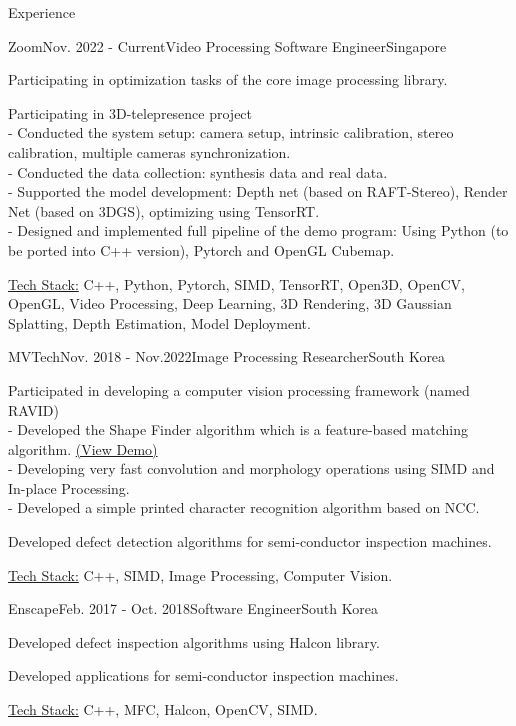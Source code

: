 \documentclass{resume}
\begin{document}
	\begin{rSection}{Experience}
		\begin{rSubsection}{Zoom}{Nov. 2022 - Current}{Video Processing Software  Engineer}{Singapore}
			\item Participating in optimization tasks of the core image processing library.
			\item Participating in 3D-telepresence project \\
			- Conducted the system setup: camera setup,  intrinsic calibration, stereo calibration, multiple cameras synchronization.\\
			- Conducted the data collection: synthesis data and real data.\\
			- Supported the model development: Depth net (based on RAFT-Stereo),  Render Net (based on 3DGS),  optimizing using TensorRT.\\
			- Designed and implemented full pipeline of the demo program: Using Python (to be ported into C++ version), Pytorch and OpenGL Cubemap.
			\item \underline{Tech Stack:} C++, Python, Pytorch, SIMD, TensorRT, Open3D, OpenCV, OpenGL, Video Processing, Deep Learning, 3D Rendering, 3D Gaussian Splatting,  Depth Estimation,  Model Deployment.

		\end{rSubsection}

		\begin{rSubsection}{MVTech}{Nov. 2018 - Nov.2022}{Image Processing Researcher}{South Korea}
			\item Participated in developing a computer vision processing framework (named RAVID) \\
			- Developed the Shape Finder algorithm which is a feature-based matching algorithm. \href{https://blog.naver.com/mvtech_ravid/222119961697}{(View Demo)}\\ 			
- Developing very fast convolution and morphology operations using SIMD and In-place Processing. \\
			- Developed a simple printed character recognition algorithm based on NCC.	
			\item Developed defect detection algorithms for semi-conductor inspection machines.
			\item \underline{Tech Stack:} C++, SIMD, Image Processing, Computer Vision.

		\end{rSubsection}

		\begin{rSubsection}{Enscape}{Feb. 2017 - Oct. 2018}{Software Engineer}{South Korea}
			\item Developed defect inspection algorithms using Halcon library.
			\item Developed applications for semi-conductor inspection machines.
			\item \underline{Tech Stack:} C++, MFC, Halcon, OpenCV,  SIMD.


\end{rSubsection}
\end{rSection}
\end{document}
